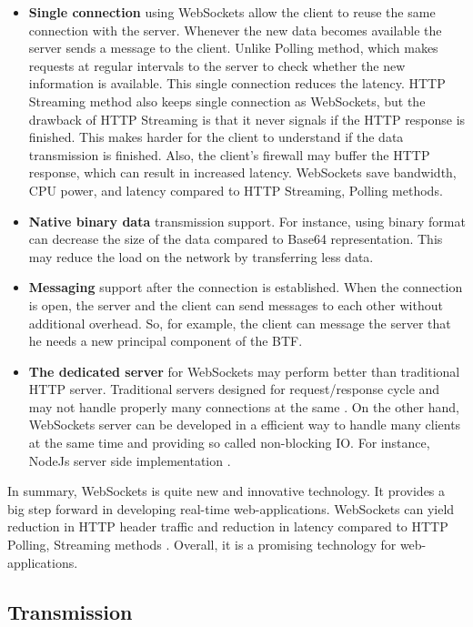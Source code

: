 \begin{itemize}
  \item \textbf{Single connection}
   using WebSockets allow the client to reuse the same connection with the server. Whenever the new data becomes available the server sends a message to the client.
Unlike Polling method, which makes requests at regular intervals to the server to check whether the new information is available.
 This single connection reduces the latency.
 HTTP Streaming method also keeps single connection as WebSockets, but the drawback of HTTP Streaming is that it never signals if the HTTP response is finished.
 This makes harder for the client to understand if the data transmission is finished. Also, the client's firewall may buffer the HTTP response, which can result in increased latency.
  WebSockets save bandwidth, CPU power, and latency compared to HTTP Streaming, Polling methods.
  \item \textbf{Native binary data} transmission support. For instance, using binary format can decrease the size of the data compared to Base64 representation.
  This may reduce the load on the network by transferring less data.
    \item \textbf{Messaging} support after the connection is established. When the connection is open, the server and the client can send messages to each other without additional overhead.
	So, for example, the client can message the server that he needs a new principal component of the BTF.
 \item \textbf{The dedicated server} for WebSockets may perform better than traditional HTTP server. 
 Traditional servers designed for request/response cycle and may not handle properly many connections at the same \cite{tutorialWebSocket}.
 On the other hand, WebSockets server can be developed in a efficient way to handle many clients at the same time and providing so called non-blocking IO.
 For instance, NodeJs server side implementation  \cite{nodejs}.
 \end{itemize}

    
In summary, WebSockets is quite new and innovative technology. 
 It provides a big step forward in developing real-time web-applications.
 WebSockets can yield reduction in HTTP header traffic and reduction in latency compared to HTTP Polling, Streaming methods \cite[Ch.\ 1]{WebSockets}.
Overall, it is a promising technology for web-applications.


\subsection{Transmission}
\label{chapter:transmission}

